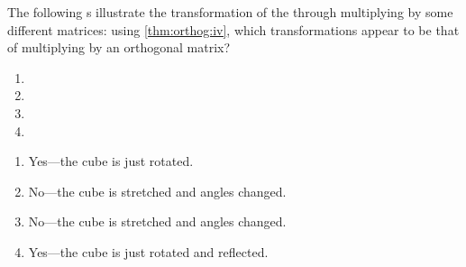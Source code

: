 \begin{example} \label{eg:}
The following s illustrate the transformation of the  through multiplying by some different matrices: using \autoref{thm:orthog:iv}, which transformations appear to be that of multiplying by an orthogonal matrix?
\begin{enumerate}
\item {}

\item {}

\def\unithousesize{small}
\item {}

%
%

\def\unithousesize{small}
\item {}
\end{enumerate}

\begin{solution} 
\begin{enumerate}
\item Yes---the cube is just rotated.
\item No---the cube is stretched and angles changed.
\item No---the cube is stretched and angles changed.
\item Yes---the cube is just rotated and reflected.
\end{enumerate}
\end{solution}
\end{example}









